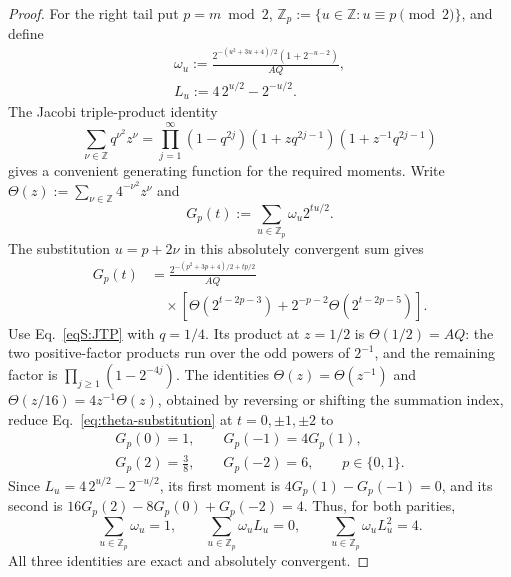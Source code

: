 \documentclass[journal,twocolumn]{IEEEtran}
\theoremstyle{definition}
\theoremstyle{plain}
\begin{document}
\begin{proof}
For the right tail put $p=m\bmod2$,
$\mathbb Z_p:=\{u\in\mathbb Z:u\equiv p\pmod2\}$, and define
\begin{equation}
 \begin{gathered}
 \omega_u:=\frac{2^{-(u^2+3u+4)/2}(1+2^{-u-2})}{AQ},\\
 L_u:=4\,2^{u/2}-2^{-u/2}.
 \end{gathered}
 \label{eqS:omega-L}
\end{equation}
The Jacobi triple-product identity
\begin{equation}
 \sum_{\nu\in\mathbb Z}q^{\nu^2}z^\nu
 =\prod_{j=1}^{\infty}(1-q^{2j})
  (1+zq^{2j-1})(1+z^{-1}q^{2j-1})
 \label{eqS:JTP}
\end{equation}
gives a convenient generating function for the required moments.
Write $\Theta(z):=\sum_{\nu\in\mathbb Z}4^{-\nu^2}z^\nu$ and
\begin{equation}
 G_p(t):=\sum_{u\in\mathbb Z_p}\omega_u2^{tu/2}.
 \label{eq:theta-generator}
\end{equation}
The substitution $u=p+2\nu$ in this absolutely convergent sum gives
\begin{equation}
 \begin{aligned}
 G_p(t)&=\frac{2^{-(p^2+3p+4)/2+tp/2}}{AQ}\\
 &\quad\times\left[\Theta(2^{t-2p-3})
       +2^{-p-2}\Theta(2^{t-2p-5})\right].
 \end{aligned}
 \label{eq:theta-substitution}
\end{equation}
Use Eq.~\eqref{eqS:JTP} with $q=1/4$.  Its product at $z=1/2$
is $\Theta(1/2)=AQ$: the two positive-factor products run over the odd
powers of $2^{-1}$, and the remaining factor is
$\prod_{j\geq1}(1-2^{-4j})$.
The identities $\Theta(z)=\Theta(z^{-1})$ and
$\Theta(z/16)=4z^{-1}\Theta(z)$, obtained by reversing or shifting the
summation index, reduce Eq.~\eqref{eq:theta-substitution} at
$t=0,\pm1,\pm2$ to
\begin{equation}
 \begin{gathered}
 G_p(0)=1,\qquad G_p(-1)=4G_p(1),\\
 G_p(2)=\frac38,\qquad G_p(-2)=6,
 \qquad p\in\{0,1\}.
 \end{gathered}
 \label{eq:theta-generator-values}
\end{equation}
Since $L_u=4\,2^{u/2}-2^{-u/2}$, its first moment is
$4G_p(1)-G_p(-1)=0$, and its second is
$16G_p(2)-8G_p(0)+G_p(-2)=4$.  Thus, for both parities,
\begin{equation}
 \sum_{u\in\mathbb Z_p}\omega_u=1,\qquad
 \sum_{u\in\mathbb Z_p}\omega_uL_u=0,\qquad
 \sum_{u\in\mathbb Z_p}\omega_uL_u^2=4.
 \label{eqS:theta-moments}
\end{equation}
All three identities are exact and absolutely convergent.


\end{proof}
\end{document}
